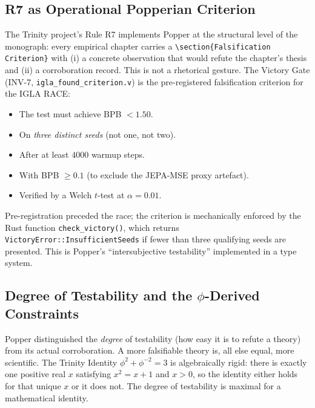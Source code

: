 \subsection{R7 as Operational Popperian Criterion}

The Trinity project's Rule R7 implements Popper at the structural level of the
monograph: every empirical chapter carries a \verb|\section{Falsification Criterion}|
with (i) a concrete observation that would refute the chapter's thesis and
(ii) a corroboration record.  This is not a rhetorical gesture.  The Victory
Gate (INV-7, \texttt{igla\_found\_criterion.v}) is the pre-registered
falsification criterion for the IGLA RACE:

\begin{itemize}
  \item The test must achieve BPB \(< 1.50\).
  \item On \emph{three distinct seeds} (not one, not two).
  \item After at least \(4000\) warmup steps.
  \item With BPB \(\ge 0.1\) (to exclude the JEPA-MSE proxy artefact).
  \item Verified by a Welch \(t\)-test at \(\alpha = 0.01\).
\end{itemize}

Pre-registration preceded the race; the criterion is mechanically enforced by
the Rust function \texttt{check\_victory()}, which returns
\texttt{VictoryError::InsufficientSeeds} if fewer than three qualifying seeds
are presented.  This is Popper's ``intersubjective testability'' implemented
in a type system.

\subsection{Degree of Testability and the \(\phi\)-Derived Constraints}

Popper distinguished the \emph{degree} of testability (how easy it is to refute
a theory) from its actual corroboration.  A more falsifiable theory is, all
else equal, more scientific.  The Trinity Identity \(\phi^2 + \phi^{-2} = 3\)
is algebraically rigid: there is exactly one positive real \(x\) satisfying
\(x^2 = x + 1\) and \(x > 0\), so the identity either holds for that unique
\(x\) or it does not.  The degree of testability is maximal for a mathematical
identity.

